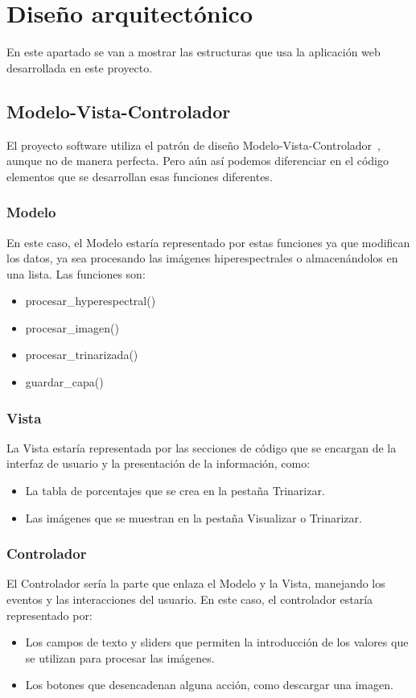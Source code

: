 \section{Diseño arquitectónico}
En este apartado se van a mostrar las estructuras que usa la aplicación web desarrollada en este proyecto.

\subsection{Modelo-Vista-Controlador}
El proyecto software utiliza el patrón de diseño Modelo-Vista-Controlador~\cite{mvc}, aunque no de manera perfecta. Pero aún así podemos diferenciar en el código elementos que se desarrollan esas funciones diferentes.

\subsubsection{Modelo}
En este caso, el Modelo estaría representado por estas funciones ya que modifican los datos, ya sea procesando las imágenes hiperespectrales o  almacenándolos en una lista. Las funciones son:
\begin{itemize}
    \item procesar\_hyperespectral()
    \item procesar\_imagen()
    \item procesar\_trinarizada()
    \item guardar\_capa()
\end{itemize}

\subsubsection{Vista}
La Vista estaría representada por las secciones de código que se encargan de la interfaz de usuario y la presentación de la información, como:
\begin{itemize}
    \item La tabla de porcentajes que se crea en la pestaña Trinarizar.
    \item Las imágenes que se muestran en la pestaña Visualizar o Trinarizar.
\end{itemize}

\subsubsection{Controlador}
El Controlador sería la parte que enlaza el Modelo y la Vista, manejando los eventos y las interacciones del usuario. En este caso, el controlador estaría representado por:
\begin{itemize}
    \item Los campos de texto y sliders que permiten la introducción de  los valores que se utilizan para procesar las imágenes.
    \item Los botones que desencadenan alguna acción, como descargar una imagen.
\end{itemize}


